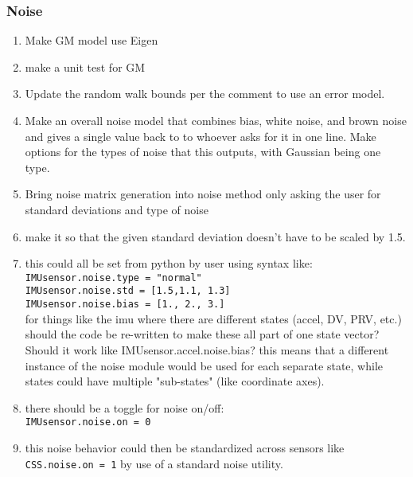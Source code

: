 \documentclass[]{BasiliskReportMemo}
\begin{document}
\subsubsection{Noise}
\begin{enumerate}
	\item Make GM model use Eigen
	\item make a unit test for GM
	\item Update the random walk bounds per the comment to use an error model.
	\item Make an overall noise model that combines bias, white noise, and brown noise and gives a single value back to to whoever asks for it in one line. Make options for the types of noise that this outputs, with Gaussian being one type.
	\item Bring noise matrix generation into noise method only asking the user for standard deviations and type of noise
	\item make it so that the given standard deviation doesn't have to be scaled by 1.5.
	\item this could all be set from python by user using syntax like:\\
	\verb|IMUsensor.noise.type = "normal"|\\
	\verb|IMUsensor.noise.std = [1.5,1.1, 1.3]|\\
	\verb|IMUsensor.noise.bias = [1., 2., 3.]|\\
	\subitem for things like the imu where there are different states (accel, DV, PRV, etc.) should the code be re-written to make these all part of one state vector? Should it work like IMUsensor.accel.noise.bias? this means that a different instance of the noise module would be used for each separate state, while states could have multiple "sub-states" (like coordinate axes).
	\item there should be a toggle for noise on/off:\\
	\verb|IMUsensor.noise.on = 0|\\
	\item this noise behavior could then be standardized across sensors like \verb|CSS.noise.on = 1| by use of a standard noise utility.
\end{enumerate}
\end{document}
